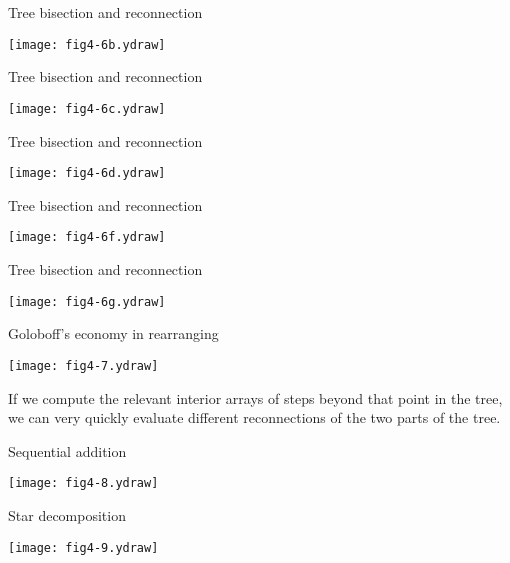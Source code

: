 \documentclass[bluish,slideColor,colorBG,pdf]{prosper}
\begin{document}
\begin{slide}[Replace]{Tree bisection and reconnection}

\centerline{\texttt{[image: fig4-6b.ydraw]}}

\end{slide}

\begin{slide}[Replace]{Tree bisection and reconnection}

\centerline{\texttt{[image: fig4-6c.ydraw]}}

\end{slide}

\begin{slide}[Replace]{Tree bisection and reconnection}

\centerline{\texttt{[image: fig4-6d.ydraw]}}

\end{slide}

\begin{slide}[Replace]{Tree bisection and reconnection}

\centerline{\texttt{[image: fig4-6f.ydraw]}}

\end{slide}

\begin{slide}[Replace]{Tree bisection and reconnection}

\centerline{\texttt{[image: fig4-6g.ydraw]}}

\end{slide}

\begin{slide}[Replace]{Goloboff's economy in rearranging}

\centerline{\texttt{[image: fig4-7.ydraw]}}
\bigskip

If we compute the relevant interior arrays of steps beyond that point in the 
tree, we can very quickly evaluate different reconnections of the two parts of the tree.


\end{slide}

\begin{slide}[Replace]{Sequential addition}

\centerline{\texttt{[image: fig4-8.ydraw]}}

\end{slide}

\begin{slide}[Replace]{Star decomposition}

\centerline{\texttt{[image: fig4-9.ydraw]}}

\end{slide}
\end{document}
